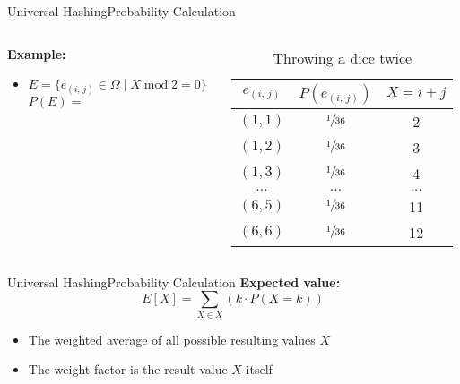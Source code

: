 \begin{frame}{Universal Hashing}{Probability Calculation}
  \begin{columns}
    \begin{column}{0.55\linewidth}
      \textbf{Example:}
      \begin{itemize}
        \item
          $E = \{e_{(i,\,j)} \in \Omega
          \mid X \;\mathrm{mod}\; 2 = 0\}$\\
          $P(E) =$
      \end{itemize}
    \end{column}
    \begin{column}{0.45\linewidth}
      \begin{table}[!h]
        \caption{Throwing a dice twice}
        \label{tab:probabilities:rolling_dice_twice3}
        \begin{tabularx}{0.95\linewidth}{c|cc}
          $e_{(i,\,j)}$ & $P(e_{(i,\,j)})$ & $X = i + j$\\
          \midrule
          $(1, 1)$ & $\sfrac{1}{36}$ & 2\\
          $(1, 2)$ & $\sfrac{1}{36}$ & 3\\
          $(1, 3)$ & $\sfrac{1}{36}$ & 4\\
          $\dots$ & $\dots$ & $\dots$\\
          $(6, 5)$ & $\sfrac{1}{36}$ & 11\\
          $(6, 6)$ & $\sfrac{1}{36}$ & 12\\
        \end{tabularx}
      \end{table}
    \end{column}
  \end{columns}
\end{frame}


\begin{frame}{Universal Hashing}{Probability Calculation}
  \textbf{Expected value:}
  \[E[X]
    = \sum_{X \in X} \left(k \cdot P(X = k)\right)\]
  \begin{itemize}
    \item
      The weighted average of all possible resulting values $X$
    \item
      The weight factor is the result value $X$ itself
  \end{itemize}
\end{frame}

